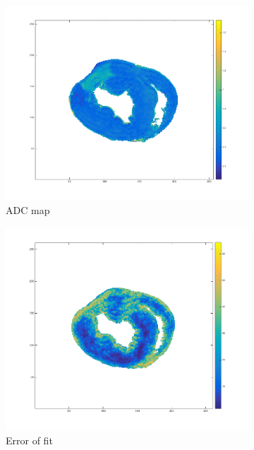 \begin{figure}[h!]
    \begin{subfigure}{.31\textwidth}
        \includegraphics[width=\textwidth]{figures/pig6_adc_24}
        \caption{ADC map}
        \label{fig:pig6_adc}
    \end{subfigure}
    \begin{subfigure}{.31\textwidth}
        \includegraphics[width=\textwidth]{figures/pig6_err_24}
        \caption{Error of fit}
        \label{fig:pig6_err}
    \end{subfigure}
    \begin{subfigure}{.31\textwidth}

\end{subfigure}
\end{figure}
